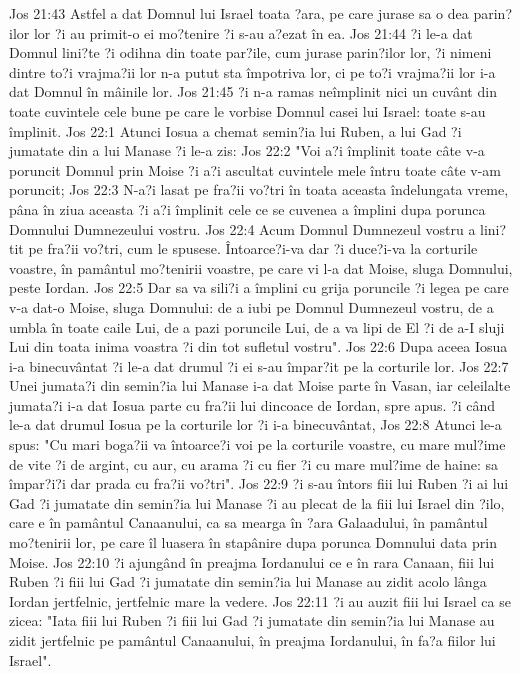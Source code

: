 Jos 21:43  Astfel a dat Domnul lui Israel toata ?ara, pe care jurase sa o dea parin?ilor lor ?i au primit-o ei mo?tenire ?i s-au a?ezat în ea.
Jos 21:44  ?i le-a dat Domnul lini?te ?i odihna din toate par?ile, cum jurase parin?ilor lor, ?i nimeni dintre to?i vrajma?ii lor n-a putut sta împotriva lor, ci pe to?i vrajma?ii lor i-a dat Domnul în mâinile lor.
Jos 21:45  ?i n-a ramas neîmplinit nici un cuvânt din toate cuvintele cele bune pe care le vorbise Domnul casei lui Israel: toate s-au împlinit.
Jos 22:1  Atunci Iosua a chemat semin?ia lui Ruben, a lui Gad ?i jumatate din a lui Manase ?i le-a zis:
Jos 22:2  "Voi a?i împlinit toate câte v-a poruncit Domnul prin Moise ?i a?i ascultat cuvintele mele întru toate câte v-am poruncit;
Jos 22:3  N-a?i lasat pe fra?ii vo?tri în toata aceasta îndelungata vreme, pâna în ziua aceasta ?i a?i împlinit cele ce se cuvenea a împlini dupa porunca Domnului Dumnezeului vostru.
Jos 22:4  Acum Domnul Dumnezeul vostru a lini?tit pe fra?ii vo?tri, cum le spusese. Întoarce?i-va dar ?i duce?i-va la corturile voastre, în pamântul mo?tenirii voastre, pe care vi l-a dat Moise, sluga Domnului, peste Iordan.
Jos 22:5  Dar sa va sili?i a împlini cu grija poruncile ?i legea pe care v-a dat-o Moise, sluga Domnului: de a iubi pe Domnul Dumnezeul vostru, de a umbla în toate caile Lui, de a pazi poruncile Lui, de a va lipi de El ?i de a-I sluji Lui din toata inima voastra ?i din tot sufletul vostru".
Jos 22:6  Dupa aceea Iosua i-a binecuvântat ?i le-a dat drumul ?i ei s-au împar?it pe la corturile lor.
Jos 22:7  Unei jumata?i din semin?ia lui Manase i-a dat Moise parte în Vasan, iar celeilalte jumata?i i-a dat Iosua parte cu fra?ii lui dincoace de Iordan, spre apus. ?i când le-a dat drumul Iosua pe la corturile lor ?i i-a binecuvântat,
Jos 22:8  Atunci le-a spus: "Cu mari boga?ii va întoarce?i voi pe la corturile voastre, cu mare mul?ime de vite ?i de argint, cu aur, cu arama ?i cu fier ?i cu mare mul?ime de haine: sa împar?i?i dar prada cu fra?ii vo?tri".
Jos 22:9  ?i s-au întors fiii lui Ruben ?i ai lui Gad ?i jumatate din semin?ia lui Manase ?i au plecat de la fiii lui Israel din ?ilo, care e în pamântul Canaanului, ca sa mearga în ?ara Galaadului, în pamântul mo?tenirii lor, pe care îl luasera în stapânire dupa porunca Domnului data prin Moise.
Jos 22:10  ?i ajungând în preajma Iordanului ce e în rara Canaan, fiii lui Ruben ?i fiii lui Gad ?i jumatate din semin?ia lui Manase au zidit acolo lânga Iordan jertfelnic, jertfelnic mare la vedere.
Jos 22:11  ?i au auzit fiii lui Israel ca se zicea: "Iata fiii lui Ruben ?i fiii lui Gad ?i jumatate din semin?ia lui Manase au zidit jertfelnic pe pamântul Canaanului, în preajma Iordanului, în fa?a fiilor lui Israel".
